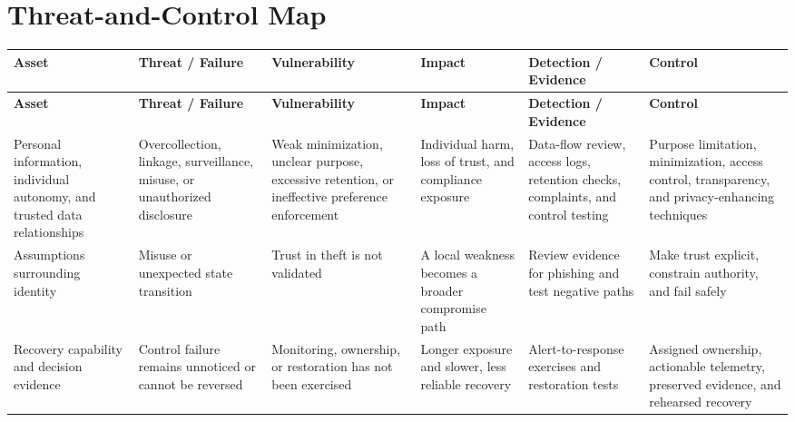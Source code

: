 \documentclass[11pt]{article}
\begin{document}
\section*{Threat-and-Control Map}
\begingroup\scriptsize\setlength{\tabcolsep}{2pt}
\begin{longtable}{>{\RaggedRight\arraybackslash}p{}>{\RaggedRight\arraybackslash}p{}>{\RaggedRight\arraybackslash}p{}>{\RaggedRight\arraybackslash}p{}>{\RaggedRight\arraybackslash}p{}>{\RaggedRight\arraybackslash}p{}}
\toprule\rowcolor{Navy}\color{white}\textbf{Asset} & \color{white}\textbf{Threat / Failure} & \color{white}\textbf{Vulnerability} & \color{white}\textbf{Impact} & \color{white}\textbf{Detection / Evidence} & \color{white}\textbf{Control}\\\midrule
\endfirsthead
\toprule\rowcolor{Navy}\color{white}\textbf{Asset} & \color{white}\textbf{Threat / Failure} & \color{white}\textbf{Vulnerability} & \color{white}\textbf{Impact} & \color{white}\textbf{Detection / Evidence} & \color{white}\textbf{Control}\\\midrule
\endhead
Personal information, individual autonomy, and trusted data relationships & Overcollection, linkage, surveillance, misuse, or unauthorized disclosure & Weak minimization, unclear purpose, excessive retention, or ineffective preference enforcement & Individual harm, loss of trust, and compliance exposure & Data-flow review, access logs, retention checks, complaints, and control testing & Purpose limitation, minimization, access control, transparency, and privacy-enhancing techniques\\\midrule
Assumptions surrounding identity & Misuse or unexpected state transition & Trust in theft is not validated & A local weakness becomes a broader compromise path & Review evidence for phishing and test negative paths & Make trust explicit, constrain authority, and fail safely\\\midrule
Recovery capability and decision evidence & Control failure remains unnoticed or cannot be reversed & Monitoring, ownership, or restoration has not been exercised & Longer exposure and slower, less reliable recovery & Alert-to-response exercises and restoration tests & Assigned ownership, actionable telemetry, preserved evidence, and rehearsed recovery\\\midrule
\bottomrule
\end{longtable}
\endgroup
\end{document}
